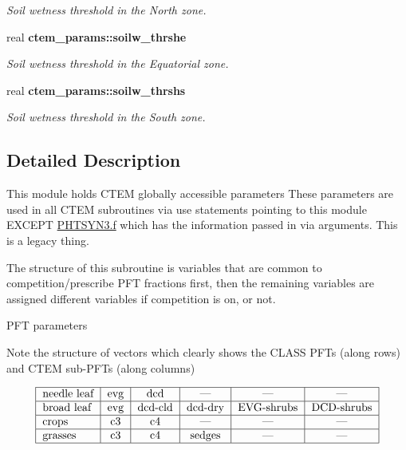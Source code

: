 \begin{DoxyCompactItemize}
\begin{DoxyCompactList}\small\item\em Soil wetness threshold in the North zone. \end{DoxyCompactList}\item 
\hypertarget{namespacectem__params_adfd72c895e5b156dfa2bab6d694ab849}{}real {\bfseries ctem\+\_\+params\+::soilw\+\_\+thrshe}\label{namespacectem__params_adfd72c895e5b156dfa2bab6d694ab849}

\begin{DoxyCompactList}\small\item\em Soil wetness threshold in the Equatorial zone. \end{DoxyCompactList}\item 
\hypertarget{namespacectem__params_ae3cc62b58531c7d353cc8baac1c1fd6a}{}real {\bfseries ctem\+\_\+params\+::soilw\+\_\+thrshs}\label{namespacectem__params_ae3cc62b58531c7d353cc8baac1c1fd6a}

\begin{DoxyCompactList}\small\item\em Soil wetness threshold in the South zone. \end{DoxyCompactList}\end{DoxyCompactItemize}


\subsection{Detailed Description}
This module holds C\+T\+E\+M globally accessible parameters These parameters are used in all C\+T\+E\+M subroutines via use statements pointing to this module E\+X\+C\+E\+P\+T \hyperlink{PHTSYN3_8f}{P\+H\+T\+S\+Y\+N3.\+f} which has the information passed in via arguments. This is a legacy thing. 

The structure of this subroutine is variables that are common to competition/prescribe P\+F\+T fractions first, then the remaining variables are assigned different variables if competition is on, or not.

P\+F\+T parameters

Note the structure of vectors which clearly shows the C\+L\+A\+S\+S P\+F\+Ts (along rows) and C\+T\+E\+M sub-\/\+P\+F\+Ts (along columns)

\[ \begin{tabular} { | l | c | c | c | c | c | } \hline needle leaf & evg & dcd & --- & ---& ---\\ \hline broad leaf & evg & dcd-cld & dcd-dry & EVG-shrubs & DCD-shrubs\\ \hline crops & c3 & c4 & --- & ---& ---\\ \hline grasses & c3 & c4 & sedges & ---& ---\\ \hline \end{tabular} \]

